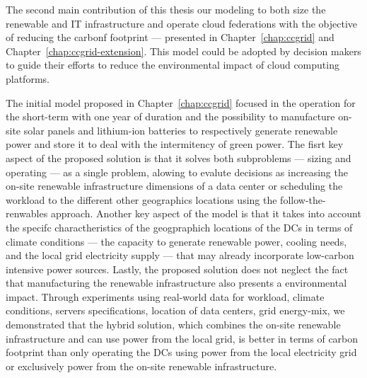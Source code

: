 The second main contribution of this thesis our modeling to both size the renewable and IT infrastructure and operate cloud federations with the objective of reducing the carbonf footprint --- presented in Chapter~\ref{chap:ccgrid} and Chapter~\ref{chap:ccgrid-extension}. This model could be adopted by decision makers to guide their efforts to reduce the environmental impact of cloud computing platforms.

The initial model proposed in Chapter~\ref{chap:ccgrid} focused in the operation for the short-term with one year of duration and the possibility to manufacture on-site solar panels and lithium-ion batteries to respectively generate renewable power and store it to deal with the intermitency of green power. The fisrt key aspect of the proposed solution is that it solves both subproblems --- sizing and operating --- as a single problem, alowing to evalute decisions as increasing the on-site renewable infrastructure dimensions of a data center or scheduling the workload to the different other geographics locations using the follow-the-renwables approach. Another key aspect of the model is that it takes into account the specifc charactheristics of the geogpraphich locations of the DCs in terms of climate conditions --- the capacity to generate renewable power, cooling needs, and the local grid electricity supply --- that may already incorporate low-carbon intensive power sources. Lastly, the proposed solution does not neglect the fact that manufacturing the renewable infrastructure also presents a environmental impact. Through experiments using real-world data for workload, climate conditions, servers specifications, location of data centers, grid energy-mix,  we demonstrated that the hybrid solution, which combines the on-site renewable infrastructure and can use power from the local grid, is better in terms of carbon footprint than only operating the DCs using power from the local electricity grid or exclusively power from the on-site renewable infrastructure.

